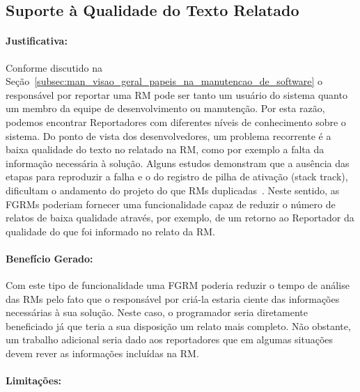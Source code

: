 \subsection{Suporte à Qualidade do Texto Relatado}
\label{sub:supote_a_qualidade_do_relato}


\paragraph{Justificativa:}
\label{par:justificativa_s01}

Conforme discutido na
Seção~\ref{subsec:man_visao_geral_papeis_na_manutencao_de_software} o
responsável por reportar uma RM pode ser tanto um usuário do sistema quanto um
membro da equipe de desenvolvimento ou manutenção. Por esta razão, podemos
encontrar Reportadores com diferentes níveis de conhecimento sobre o sistema.
Do ponto de vista dos desenvolvedores, um problema recorrente é a baixa
qualidade do texto no relatado na RM, como por exemplo a falta da informação
necessária à solução. Alguns estudos demonstram que a ausência das etapas para
reproduzir a falha e o do registro de pilha de ativação (stack track),
dificultam o andamento do projeto do que RMs
duplicadas~\cite{bettenburg2008makes, bettenburg2007quality}. Neste sentido, as
FGRMs poderiam fornecer uma funcionalidade capaz de reduzir o número de relatos
de baixa qualidade através, por exemplo, de um retorno ao Reportador da
qualidade do que foi informado no relato da RM\@.

\paragraph{Benefício Gerado:}
\label{par:beneficio_s01}

Com este tipo de funcionalidade uma FGRM poderia reduzir o tempo de análise das
RMs pelo fato que o responsável por criá-la estaria ciente das informações
necessárias à sua solução. Neste caso, o programador seria diretamente
beneficiado já que teria a sua disposição um relato mais completo.  Não
obstante, um trabalho adicional seria dado aos reportadores que em algumas
situações devem rever as informações incluídas na RM\@.

\paragraph{Limitações:}
\label{par:limitacoes_s01}

